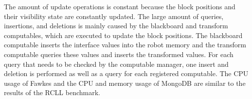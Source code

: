 The amount of update operations is constant because the block
positions and their visibility state are constantly updated. The large
amount of queries, insertions, and deletions is mainly caused by the
blackboard and transform computables, which are executed to update the
block positions. The blackboard computable inserts the interface
values into the robot memory and the transform computable queries
these values and inserts the transformed values. For each query that
needs to be checked by the computable manager, one insert and deletion
is performed as well as a query for each registered computable.  The
CPU usage of Fawkes and the CPU and memory usage of MongoDB are similar
to the results of the RCLL benchmark.